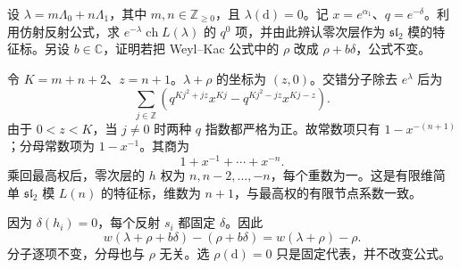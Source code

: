 \begin{exercise}\label{b5:ex:G-horizontal-character}
	设 \(\lambda=m\Lambda_0+n\Lambda_1\)，其中 \(m,n\in\mathbb Z_{\ge0}\)，且 \(\lambda(\mathrm d)=0\)。记 \(x=e^{\alpha_1}\)、\(q=e^{-\delta}\)。利用仿射反射公式，求 \(e^{-\lambda}\operatorname{ch}L(\lambda)\) 的 \(q^0\) 项，并由此辨认零次层作为 \(\mathfrak{sl}_2\) 模的特征标。另设 \(b\in\mathbb C\)，证明若把 Weyl–Kac 公式中的 \(\rho\) 改成 \(\rho+b\delta\)，公式不变。
\end{exercise}
\begin{solution}
	令 \(K=m+n+2\)、\(z=n+1\)。\(\lambda+\rho\) 的坐标为 \((z,0)\)。交错分子除去 \(e^\lambda\) 后为
	\[
		\sum_{j\in\mathbb Z}\left(q^{Kj^2+jz}x^{Kj}
		-q^{Kj^2-jz}x^{Kj-z}\right).
	\]
	由于 \(0<z<K\)，当 \(j\ne0\) 时两种 \(q\) 指数都严格为正。故常数项只有 \(1-x^{-(n+1)}\)；分母常数项为 \(1-x^{-1}\)。其商为
	\[
		1+x^{-1}+\cdots+x^{-n}.
	\]
	乘回最高权后，零次层的 \(h\) 权为 \(n,n-2,\ldots,-n\)，每个重数为一。这是有限维简单 \(\mathfrak{sl}_2\) 模 \(L(n)\) 的特征标，维数为 \(n+1\)，与最高权的有限节点系数一致。

	因为 \(\delta(h_i)=0\)，每个反射 \(s_i\) 都固定 \(\delta\)。因此
	\[
		w(\lambda+\rho+b\delta)-(\rho+b\delta)
		=w(\lambda+\rho)-\rho.
	\]
	分子逐项不变，分母也与 \(\rho\) 无关。选 \(\rho(\mathrm d)=0\) 只是固定代表，并不改变公式。
\end{solution}
